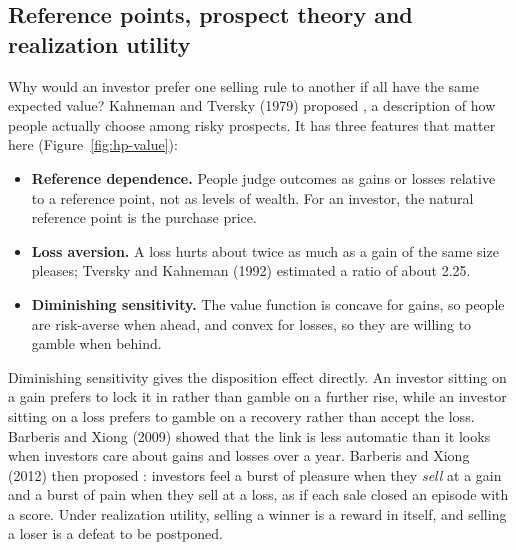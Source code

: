 \subsection{Reference points, prospect theory and realization utility}
\label{sec:hp-prospect}

Why would an investor prefer one selling rule to another if all have the same expected value? Kahneman and Tversky (1979) proposed \label{kt:prospect-theory}, a description of how people actually choose among risky prospects. It has three features that matter here (Figure~\ref{fig:hp-value}):

\begin{itemize}
  \item \textbf{Reference dependence.} People judge outcomes as gains or losses relative to a reference point, not as levels of wealth. For an investor, the natural reference point is the purchase price.
  \item \textbf{Loss aversion.} A loss hurts about twice as much as a gain of the same size pleases; Tversky and Kahneman (1992) estimated a ratio of about 2.25.
  \item \textbf{Diminishing sensitivity.} The value function is concave for gains, so people are risk-averse when ahead, and convex for losses, so they are willing to gamble when behind.
\end{itemize}

Diminishing sensitivity gives the disposition effect directly. An investor sitting on a gain prefers to lock it in rather than gamble on a further rise, while an investor sitting on a loss prefers to gamble on a recovery rather than accept the loss. Barberis and Xiong (2009) showed that the link is less automatic than it looks when investors care about gains and losses over a year. Barberis and Xiong (2012) then proposed : investors feel a burst of pleasure when they \emph{sell} at a gain and a burst of pain when they sell at a loss, as if each sale closed an episode with a score. Under realization utility, selling a winner is a reward in itself, and selling a loser is a defeat to be postponed.


